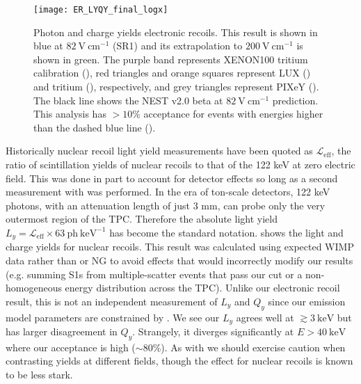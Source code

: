 \begin{figure}
\centering
\texttt{[image: ER\_LYQY\_final\_logx]}
\caption{Photon and charge yields electronic recoils.  This result is shown in blue at $82\ \mathrm{V\ cm^{-1}}$ (SR1) and its
extrapolation to $200\ \mathrm{V\ cm^{-1}}$ is shown in green.  The purple band represents XENON100 tritium calibration
(), red triangles and orange squares represent
LUX  () and tritium (), respectively, and grey triangles represent PIXeY 
().  The black line shows the NEST v2.0 beta at $82\ \mathrm{V\ cm^{-1}}$ prediction.  This analysis has $> 10\%$
acceptance for events with energies higher than the dashed blue line ().}
\label{fig:er_nr_calibrations_results_ly_qy_er}
\end{figure}

Historically nuclear recoil light yield measurements have been quoted as
$\mathcal{L}_{\mathrm{eff}}$, the ratio of scintillation yields of nuclear recoils to that of the  122 keV \gammaray at zero
electric field.  This was done in part to account for detector effects so long as a second measurement with  was
performed.  In the era of ton-scale detectors, 122 keV photons, with an attenuation length of just 3 mm, can probe only the very
outermost region of the TPC.  Therefore the absolute light yield $L_y = \mathcal{L}_{\mathrm{eff}} \times 63\ \mathrm{ph\ keV^{-1}}$ has
become the standard notation.   shows the light and charge yields for nuclear
recoils.  This result was calculated using expected WIMP data rather than \ambe or NG to avoid effects that would incorrectly modify
our results (e.g. summing S1s from multiple-scatter events that pass our cut or a non-homogeneous energy distribution across the
TPC).  Unlike our electronic recoil result, this is not an independent measurement of $L_y$ and $Q_y$ since our emission model parameters
are constrained by .  We
see our $L_y$ agrees well at $\gtrsim 3\ \mathrm{keV}$ but has larger disagreement in $Q_y$.  Strangely, it diverges significantly at
$E > 40\ \mathrm{keV}$ where our acceptance is high (${\sim} 80\%$).  As with  we should
exercise caution when contrasting yields at different fields, though the effect for nuclear recoils is known to be less stark.


